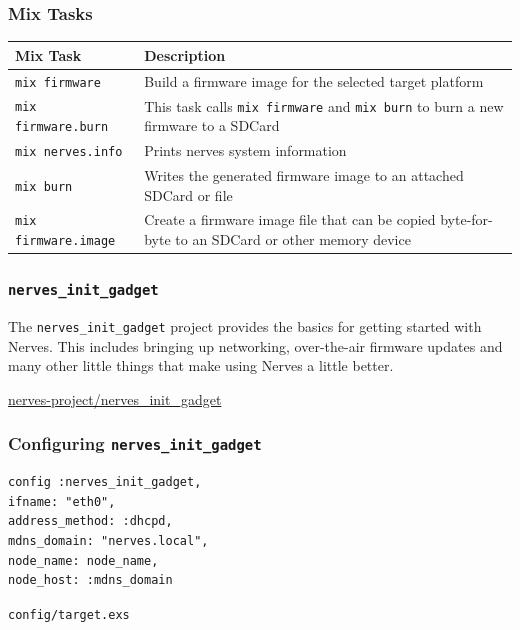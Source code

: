 \documentclass[10pt,xcolor=pdflatex,dvipsnames,table]{beamer}
\begin{document}
\begin{frame}
  \frametitle{Mix Tasks}

\begin{center}
\begin{tabular}{|l|p{}|}\hline
    \textbf{Mix Task} & \textbf{Description} \\ \hline
    \texttt{mix firmware} & Build a firmware image for the selected target platform \\
    \texttt{mix firmware.burn} & This task calls \texttt{mix firmware} and \texttt{mix burn} to burn a new firmware to a SDCard \\
    \texttt{mix nerves.info} & Prints nerves system information \\
    \texttt{mix burn} & Writes the generated firmware image to an attached SDCard or file \\
    \texttt{mix firmware.image} & Create a firmware image file that can be copied byte-for-byte to an SDCard or other memory device\\ \hline
\end{tabular}
\end{center}
\end{frame}


\begin{frame}[standout]
  \frametitle{\texttt{nerves\_init\_gadget}}

  {\color{white}

  The \texttt{nerves\_init\_gadget} project provides the basics for getting
  started with Nerves. This includes bringing up networking, over-the-air
  firmware updates and many other little things that make using Nerves a little
  better.

  \faGithub \hspace{1pt} \href{https://github.com/nerves-project/nerves_init_gadget}{nerves-project/nerves\_init\_gadget}
  }
\end{frame}

\begin{frame}[fragile]
  \frametitle{Configuring \texttt{nerves\_init\_gadget}}

  \begin{example}
\begin{listing}[H]
  \begin{verbatim}
config :nerves_init_gadget,
ifname: "eth0",
address_method: :dhcpd,
mdns_domain: "nerves.local",
node_name: node_name,
node_host: :mdns_domain
\end{verbatim}
\caption{\texttt{config/target.exs}}
\end{listing}
\end{example}
\end{frame}
\end{document}
